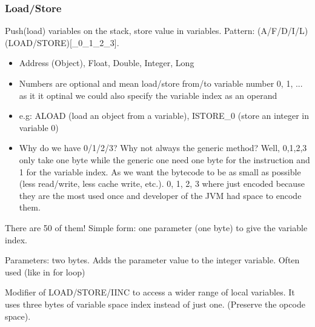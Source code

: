 \subsubsection{Load/Store}
    \theoremstyle{definition}
    \begin{definition}
        Push(load) variables on the stack, store value in variables.
        Pattern: (A/F/D/I/L)(LOAD/STORE)[\_0\_1\_2\_3].
        \begin{itemize}
            \item Address (Object), Float, Double, Integer, Long
            \item Numbers are optional and mean load/store from/to variable
            number 0, 1, ... as it it optinal we could also specify the variable
            index as an operand
            \item e.g: ALOAD (load an object from a variable), ISTORE\_0 (store an integer in variable 0)
            \item Why do we have 0/1/2/3? Why not always the generic method?
            Well, 0,1,2,3 only take one byte while the generic one need one byte
            for the instruction and 1 for the variable index. As we want the
            bytecode to be as small as possible (less read/write, less cache
            write, etc.). 0, 1, 2, 3 where just encoded because they are the
            most used once and developer of the JVM had space to encode them.
        \end{itemize}
        There are 50 of them!
        Simple form: one parameter (one byte) to give the variable index.
    \end{definition}
    \theoremstyle{definition}
    \begin{definition}[IINC]
        Parameters: two bytes. Adds the parameter value to the integer variable.
        Often used (like in for loop)
    \end{definition}
    \theoremstyle{definition}
    \begin{definition}[WIDE]
        Modifier of LOAD/STORE/IINC to access a wider range of local variables.
        It uses three bytes of variable space index instead of just one.
        (Preserve the opcode space).
    \end{definition}
